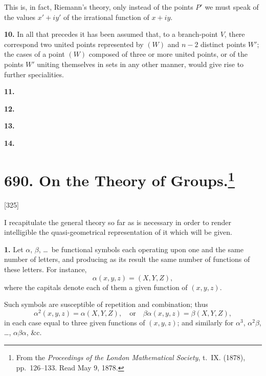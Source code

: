 \documentclass[12pt,a4paper]{article}
\theoremstyle{definition}
\begin{document}
This is, in fact, Riemann's theory, only instead of the points $P'$ we must speak of the values $x' + iy'$ of the irrational function of $x + iy$.

\medskip
\noindent\textbf{10.}\quad
In all that precedes it has been assumed that, to a branch-point $V$, there correspond two united points represented by $(W)$ and $n - 2$ distinct points $W'$; the cases of a point $(W)$ composed of three or more united points, or of the points $W'$ uniting themselves in sets in any other manner, would give rise to further specialities.

\medskip
\noindent\textbf{11.}

\medskip
\noindent\textbf{12.}

\medskip
\noindent\textbf{13.}

\medskip
\noindent\textbf{14.}

\newpage
\section[On the Theory of Groups]{690. On the Theory of Groups.\footnote{From the \textit{Proceedings of the London Mathematical Society}, t.\ IX. (1878), pp.\ 126--133. Read May 9, 1878.}}

[325]

I recapitulate the general theory so far as is necessary in order to render intelligible the quasi-geometrical representation of it which will be given.

\medskip
\noindent\textbf{1.}\quad
Let $\alpha$, $\beta$, \dots\ be functional symbols each operating upon one and the same number of letters, and producing as its result the same number of functions of these letters. For instance,
\[
\alpha(x, y, z) = (X, Y, Z),
\]
where the capitals denote each of them a given function of $(x, y, z)$.

Such symbols are susceptible of repetition and combination; thus
\[
\alpha^2(x, y, z) = \alpha(X, Y, Z),\quad \text{or}\quad
\beta\alpha(x, y, z) = \beta(X, Y, Z),
\]
in each case equal to three given functions of $(x, y, z)$; and similarly for $\alpha^3$, $\alpha^2\beta$, \dots, $\alpha\beta\alpha$, \&c.
\end{document}
